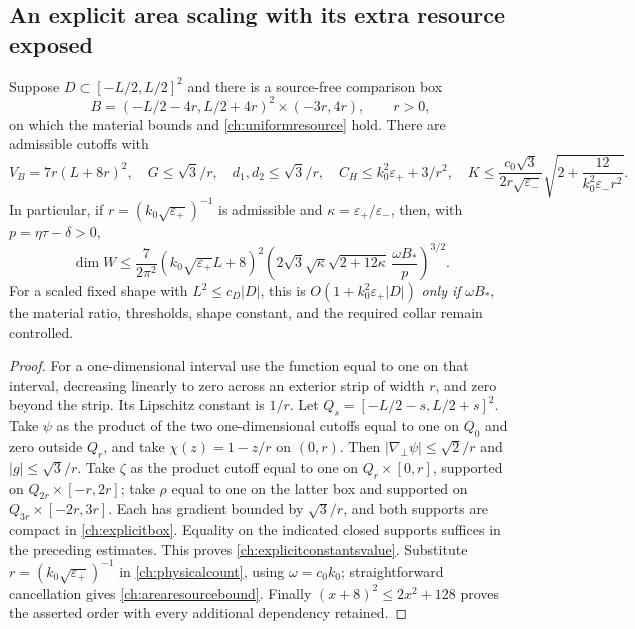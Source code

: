 \subsection{An explicit area scaling with its extra resource exposed}
\label{ch:explicitconstants}

\begin{corollary}
\label{ch:arearesource}
Suppose $D\subset[-L/2,L/2]^2$ and there is a source-free comparison box
\begin{equation}
 B=(-L/2-4r,L/2+4r)^2\times(-3r,4r),\qquad r>0,
 \label{ch:explicitbox}
\end{equation}
on which the material bounds and \eqref{ch:uniformresource} hold.
There are admissible cutoffs with
\begin{equation}
 V_B=7r(L+8r)^2,\quad
 G\leq\sqrt3/r,\quad d_1,d_2\leq\sqrt3/r,\quad
 C_H\leq k_0^2\varepsilon_++3/r^2,\quad
 K\leq\frac{c_0\sqrt3}{2r\sqrt{\varepsilon_-}}
       \sqrt{2+\frac{12}{k_0^2\varepsilon_-r^2}}.
 \label{ch:explicitconstantsvalue}
\end{equation}
In particular, if $r=(k_0\sqrt{\varepsilon_+})^{-1}$ is admissible and
$\kappa=\varepsilon_+/\varepsilon_-$, then, with
$p=\eta\tau-\delta>0$,
\begin{equation}
 \dim W\leq\frac{7}{2\pi^2}
 (k_0\sqrt{\varepsilon_+}L+8)^2
 \left(2\sqrt3\sqrt\kappa\sqrt{2+12\kappa}\,
       \frac{\omega B_*}{p}\right)^{3/2}.
 \label{ch:arearesourcebound}
\end{equation}
For a scaled fixed shape with $L^2\leq c_D|D|$, this is
$O(1+k_0^2\varepsilon_+|D|)$ \emph{only if} $\omega B_*$, the material
ratio, thresholds, shape constant, and the required collar remain controlled.
\end{corollary}
\begin{proof}
For a one-dimensional interval use the function equal to one on that
interval, decreasing linearly to zero across an exterior strip of width
$r$, and zero beyond the strip.  Its Lipschitz constant is $1/r$.
Let $Q_s=[-L/2-s,L/2+s]^2$.  Take $\psi$ as the product of the two
one-dimensional cutoffs equal to one on $Q_0$ and zero outside $Q_r$,
and take $\chi(z)=1-z/r$ on $(0,r)$.  Then
$|\nabla_\perp\psi|\leq\sqrt2/r$ and $|g|\leq\sqrt3/r$.
Take $\zeta$ as the product cutoff equal to one on
$Q_r\times[0,r]$, supported on $Q_{2r}\times[-r,2r]$;
take $\rho$ equal to one on the latter box and supported on
$Q_{3r}\times[-2r,3r]$.  Each has gradient bounded by $\sqrt3/r$,
and both supports are compact in \eqref{ch:explicitbox}.
Equality on the indicated closed supports suffices in the preceding
estimates.  This proves \eqref{ch:explicitconstantsvalue}.
Substitute $r=(k_0\sqrt{\varepsilon_+})^{-1}$ in
\eqref{ch:physicalcount}, using $\omega=c_0k_0$; straightforward
cancellation gives \eqref{ch:arearesourcebound}.
Finally $(x+8)^2\leq2x^2+128$ proves the asserted order with every
additional dependency retained.
\end{proof}

